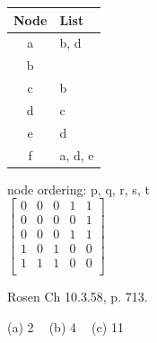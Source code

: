 \begin{questions}
    \ifprintanswers
        \vspace{-10pt}
    \fi
    \begin{solution}
    \begin{minipage}[t]{0.2\textwidth}
        \begin{tabular}{c|l}
            Node & List \\
            \hline
            a & b, d \\
            b &      \\
            c & b    \\
            d & c    \\
            e & d    \\
            f & a, d, e
        \end{tabular}
    \end{minipage}
    \begin{minipage}[T]{0.3\textwidth}
        
    \end{minipage}
    \hspace{0.3in}
    \begin{minipage}[T]{0.2\textwidth}
        node ordering: p, q, r, s, t \\
        $ \begin{bmatrix}
            0 & 0 & 0 & 1 & 1 \\
            0 & 0 & 0 & 0 & 1 \\
            0 & 0 & 0 & 1 & 1 \\
            1 & 0 & 1 & 0 & 0 \\
            1 & 1 & 1 & 0 & 0 \\
        \end{bmatrix} $
    \end{minipage}
    \end{solution}




 Rosen Ch 10.3.58, p. 713.
    \ifprintanswers
        \vspace{-10pt}
    \fi
    \begin{solution}
        (a) 2 $\;\;$ (b) 4 $\;\;$ (c) 11
        


\end{solution}
\end{questions}
